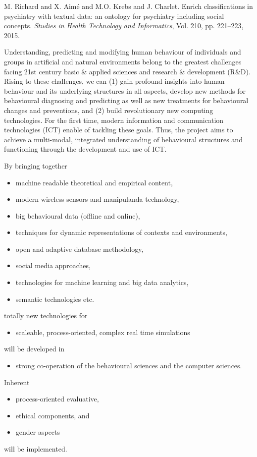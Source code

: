 \documentclass[a4paper,UKenglish]{dagrep}
\begin{document}
\begin{thebibliography}{0}
M. Richard and X. Aim\'{e} and M.O. Krebs and J.
Charlet.  Enrich classifications in psychiatry with textual
data: an ontology for psychiatry including social concepts.  \textit{Studies in {H}ealth {T}echnology and {I}nformatics}, Vol. 210, pp. 221--223, 2015.
\end{thebibliography}


{}
\license
Understanding, predicting and modifying human behaviour of individuals and
groups in artificial and natural environments belong to the greatest challenges
facing 21st century basic \& applied sciences and research \& development
(R\&D). Rising to these challenges, we can (1) gain profound insights into human
behaviour and its underlying structures in all aspects, develop new methods for
behavioural diagnosing and predicting as well as new treatments for behavioural
changes and preventions, and (2) build revolutionary new computing technologies.
For the first time, modern information and communication technologies (ICT)
enable of tackling these goals. Thus, the project aims to achieve a multi-modal,
integrated understanding of behavioural structures and functioning through the
development and use of ICT. 

By bringing together
\begin{itemize}
\item machine readable theoretical and empirical content,
\item modern wireless sensors and manipulanda technology,
\item big behavioural data (offline and online),
\item techniques for dynamic representations of contexts and environments,
\item open and adaptive database methodology,
\item social media approaches,
\item technologies for machine learning and big data analytics,
\item semantic technologies etc.
\end{itemize}
totally new technologies for
\begin{itemize}
\item scaleable, process-oriented, complex real time simulations
\end{itemize}
will be developed in
\begin{itemize}
\item strong co-operation of the behavioural sciences and the computer sciences.
\end{itemize}
Inherent
\begin{itemize}
\item process-oriented evaluative,
\item ethical components, and
\item gender aspects
\end{itemize}
will be implemented.
\end{document}
